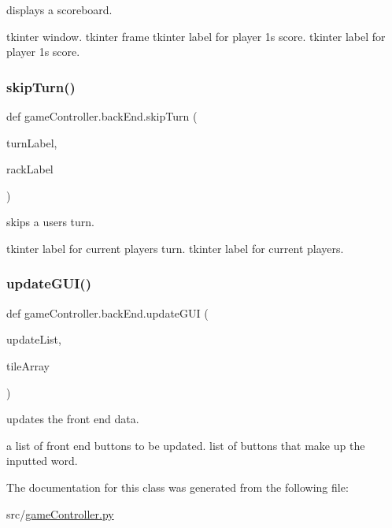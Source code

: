 displays a scoreboard. 

tkinter window.  tkinter frame  tkinter label for player 1\textquotesingle{}s score.  tkinter label for player 1\textquotesingle{}s score. \mbox{\label{classgame_controller_1_1back_end_acca208cf314ba9075c598a917c3a9d77}} 
\subsubsection{\texorpdfstring{skip\+Turn()}{skipTurn()}}
{\footnotesize\ttfamily def game\+Controller.\+back\+End.\+skip\+Turn (\begin{DoxyParamCaption}\item[{}]{turn\+Label,  }\item[{}]{rack\+Label }\end{DoxyParamCaption})}



skips a users turn. 

tkinter label for current players turn.  tkinter label for current players. \mbox{\label{classgame_controller_1_1back_end_a2ee0a55368a009401de29af9200424ee}} 
\subsubsection{\texorpdfstring{update\+G\+U\+I()}{updateGUI()}}
{\footnotesize\ttfamily def game\+Controller.\+back\+End.\+update\+G\+UI (\begin{DoxyParamCaption}\item[{}]{update\+List,  }\item[{}]{tile\+Array }\end{DoxyParamCaption})}



updates the front end data. 

a list of front end buttons to be updated.  list of buttons that make up the inputted word. 

The documentation for this class was generated from the following file\+:\begin{DoxyCompactItemize}
\item 
src/\hyperlink{game_controller_8py}{game\+Controller.\+py}\end{DoxyCompactItemize}
